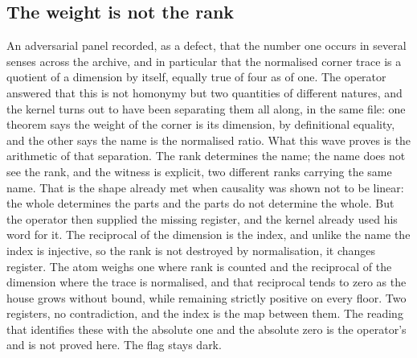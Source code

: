 \documentclass[11pt]{article}
\theoremstyle{definition}\newtheorem{deriv}{Derivation}
\begin{document}
\subsection*{The weight is not the rank}An adversarial panel recorded, as a defect, that the number one occurs in several senses across the archive, and in particular that the normalised corner trace is a quotient of a dimension by itself, equally true of four as of one. The operator answered that this is not homonymy but two quantities of different natures, and the kernel turns out to have been separating them all along, in the same file: one theorem says the weight of the corner is its dimension, by definitional equality, and the other says the name is the normalised ratio. What this wave proves is the arithmetic of that separation. The rank determines the name; the name does not see the rank, and the witness is explicit, two different ranks carrying the same name. That is the shape already met when causality was shown not to be linear: the whole determines the parts and the parts do not determine the whole. But the operator then supplied the missing register, and the kernel already used his word for it. The reciprocal of the dimension is the index, and unlike the name the index is injective, so the rank is not destroyed by normalisation, it changes register. The atom weighs one where rank is counted and the reciprocal of the dimension where the trace is normalised, and that reciprocal tends to zero as the house grows without bound, while remaining strictly positive on every floor. Two registers, no contradiction, and the index is the map between them. The reading that identifies these with the absolute one and the absolute zero is the operator's and is not proved here. The flag stays dark.
\end{document}
